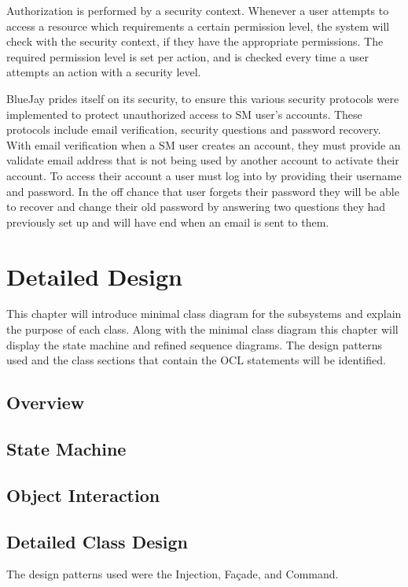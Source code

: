 \documentclass{report}
\begin{document}
	Authorization is performed by a security context.
	Whenever a user attempts to access a resource which requirements a certain permission level,
	the system will check with the security context, if they have the appropriate permissions.
	The required permission level is set per action, and is checked every time
	a user attempts an action with a security level.

	


BlueJay prides itself on its security,
to ensure this various security protocols were implemented to protect unauthorized access to SM user’s accounts.
These protocols include email verification, security questions and password recovery.
With email verification when a SM user creates an account, they must provide an validate email address that is not being used by another account to activate their account.
To access their account a user must log into by providing their username and password.
In the off chance that user forgets their password they will be able to recover and change their old password by answering two questions they had previously set up and will have end when an email is sent to them.\\





\chapter{Detailed Design}
This chapter will introduce minimal class diagram for the subsystems and explain the purpose of each class. Along with the minimal class diagram this chapter will display the state machine and refined sequence diagrams. The design patterns used and the class sections that contain the OCL statements will be identified.\\
\section{Overview}
\section{State Machine}
\section{Object Interaction}
\section{Detailed Class Design}
The design patterns used were the Injection, Façade, and Command.
\end{document}
